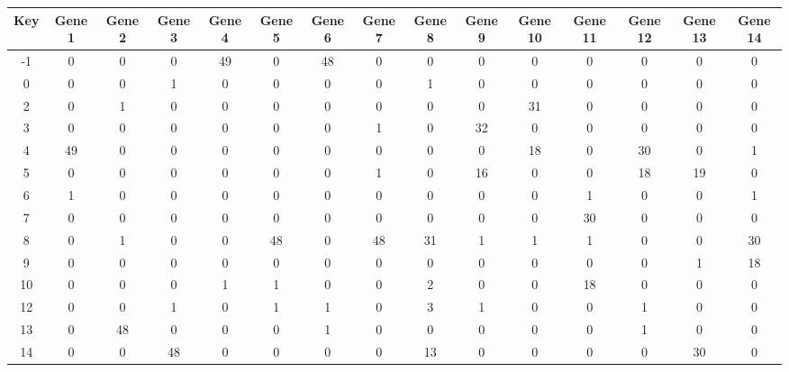 \begin{tabular}{|c|c|c|c|c|c|c|c|c|c|c|c|c|c|c|}
\hline
Key & Gene 1 & Gene 2 & Gene 3 & Gene 4 & Gene 5 & Gene 6 & Gene 7 & Gene 8 & Gene 9 & Gene 10 & Gene 11 & Gene 12 & Gene 13 & Gene 14 \\
\hline
-1 & 0 & 0 & 0 & 49 & 0 & 48 & 0 & 0 & 0 & 0 & 0 & 0 & 0 & 0 \\
0 & 0 & 0 & 1 & 0 & 0 & 0 & 0 & 1 & 0 & 0 & 0 & 0 & 0 & 0 \\
2 & 0 & 1 & 0 & 0 & 0 & 0 & 0 & 0 & 0 & 31 & 0 & 0 & 0 & 0 \\
3 & 0 & 0 & 0 & 0 & 0 & 0 & 1 & 0 & 32 & 0 & 0 & 0 & 0 & 0 \\
4 & 49 & 0 & 0 & 0 & 0 & 0 & 0 & 0 & 0 & 18 & 0 & 30 & 0 & 1 \\
5 & 0 & 0 & 0 & 0 & 0 & 0 & 1 & 0 & 16 & 0 & 0 & 18 & 19 & 0 \\
6 & 1 & 0 & 0 & 0 & 0 & 0 & 0 & 0 & 0 & 0 & 1 & 0 & 0 & 1 \\
7 & 0 & 0 & 0 & 0 & 0 & 0 & 0 & 0 & 0 & 0 & 30 & 0 & 0 & 0 \\
8 & 0 & 1 & 0 & 0 & 48 & 0 & 48 & 31 & 1 & 1 & 1 & 0 & 0 & 30 \\
9 & 0 & 0 & 0 & 0 & 0 & 0 & 0 & 0 & 0 & 0 & 0 & 0 & 1 & 18 \\
10 & 0 & 0 & 0 & 1 & 1 & 0 & 0 & 2 & 0 & 0 & 18 & 0 & 0 & 0 \\
12 & 0 & 0 & 1 & 0 & 1 & 1 & 0 & 3 & 1 & 0 & 0 & 1 & 0 & 0 \\
13 & 0 & 48 & 0 & 0 & 0 & 1 & 0 & 0 & 0 & 0 & 0 & 1 & 0 & 0 \\
14 & 0 & 0 & 48 & 0 & 0 & 0 & 0 & 13 & 0 & 0 & 0 & 0 & 30 & 0 \\
\hline
\end{tabular}